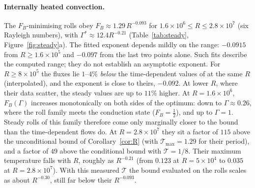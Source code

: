 \paragraph{Internally heated convection.} The $F_B$-minimising rolls obey
$F_B\approx1.29\,R^{-0.093}$ for $1.6\times10^6\le R\le2.8\times10^7$ (six Rayleigh numbers), with
$\Gamma^*\approx12.4R^{-0.21}$ (Table~\ref{tab:steady}, Figure~\ref{fig:steady}a). The fitted exponent depends
mildly on the range: $-0.0915$ from $R\ge1.6\times10^5$ and $-0.097$ from the last two points alone. Such fits
describe the computed range; they do not establish an asymptotic exponent. For $R\ge8\times10^5$ the fluxes lie
$1$--$4\%$ \emph{below} the time-dependent values of \citet{ArslanRojas2025} at the same $R$ (interpolated), and
the exponent is close to theirs, $-0.092$. At lower $R$, where their data scatter, the steady values are up to
$11\%$ higher. At $R=1.6\times10^6$, $F_B(\Gamma)$ increases monotonically on both sides of the optimum: down to
$\Gamma\approx0.26$, where the roll family meets the conduction state ($F_B=\frac12$), and up to $\Gamma=1$.
Steady rolls of this family therefore come only marginally closer to the bound than the time-dependent flows do.
At $R=2.8\times10^7$ they sit a factor of $115$ above the unconditional bound of Corollary~\ref{cor:R} (with
$\mathcal T_{\max}=1.29$ for their period), and a factor of $49$ above the conditional bound with
$\mathcal T=1/8$. Their maximum
temperature falls with $R$, roughly as $R^{-0.21}$ (from $0.123$ at $R=5\times10^4$ to $0.035$ at
$R=2.8\times10^7$). With this measured $\mathcal T$ the bound evaluated on the rolls scales as about $R^{-0.30}$,
still far below their $R^{-0.093}$.

